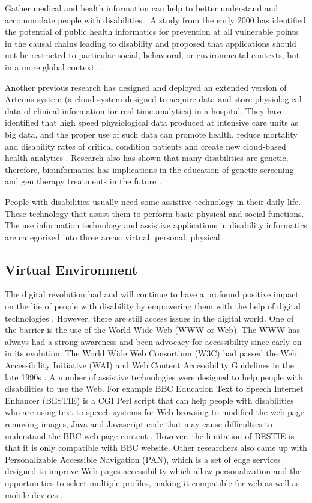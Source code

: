 Gather medical and health information can help to better understand and
accommodate people with disabilities \cite{Riga13}. A study from the early 2000 has identified the
potential of public health informatics for prevention at all vulnerable points in the causal chains leading
to disability and proposed that  applications should not be restricted to particular social, behavioral,
or environmental contexts, but in a more global context \cite{Yasnoff}.  

Another previous research has
designed and deployed an extended version of Artemis system (a cloud system designed to acquire data and
store physiological data of clinical information for real-time analytics) in a hospital. They have
identified that high speed physiological data produced at intensive care units as big data, and the proper
use of such data can promote health, reduce mortality and disability rates of critical condition patients
and create new cloud-based health analytics \cite{Khazaei14}. Research also has shown that many
disabilities are genetic, therefore, bioinformatics has implications in the education of genetic screening
and gen therapy treatments in the future \cite{Appleyard2005}.

People with disabilities usually need some 
assistive technology in their daily life. These technology that assist them to perform basic physical and 
social functions. The use information technology and assistive applications in disability informatics are 
categorized into three areas: virtual, personal, physical.
 
 \subsection{Virtual Environment}
The digital revolution had and will continue to have a profound positive impact on the life of people with
disability by empowering them with the help of digital technologies \cite{Appleyard2005}. However, there are
still access issues in the digital world. One of the barrier is the use of the World Wide Web (WWW or Web).
The WWW has always had a strong awareness and been advocacy for accessibility since early on in its
evolution. The World Wide Web Consortium (W3C) had passed the Web Accessibility Initiative (WAI) and Web
Content Accessibility Guidelines in the late 1990s \cite{Appleyard2005}. A number of assistive technologies
were designed to help people with disabilities to use the Web. For example BBC Education Text to Speech
Internet Enhancer (BESTIE) is a CGI Perl script that can help people with disabilities who are using
text-to-speech systems for Web browsing to modified the web page removing images, Java and Javascript code
that may cause difficulties to understand the BBC web page content \cite{Erra}. 
However, the limitation of BESTIE is that it is only compatible with BBC website. Other researchers also
came up with Personalizable Accessible Navigation (PAN), which is a set of edge services designed to improve
Web pages accessibility which allow  personalization and the opportunities to select multiple profiles,
making it compatible for web as well as mobile devices \cite{info:doi/10.2196/mhealth.3956}.

